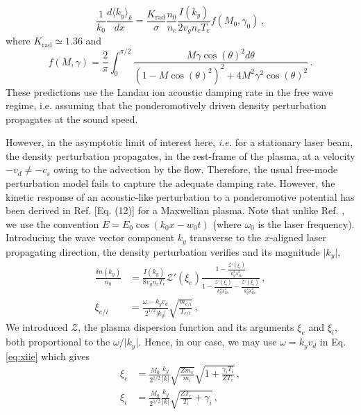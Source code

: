 \documentclass[%
 reprint,
 amsmath,amssymb,
 aps,
]{revtex4-1}
\begin{document}
\begin{equation}
\frac{1}{k_0}\frac{d \langle k_y\rangle_{k}    }{d x} = \frac{K_\mathrm{rad} }{\sigma} \frac{n_0 }{n_c}  \frac{  I(k_y) }{ 2 v_g n_c T_e }  f(M_0,\gamma_0)\, ,\label{eq:dthetarose26}
\end{equation}
where $K_\mathrm{rad} \simeq 1.36$  and 
\begin{equation}
 f(M,\gamma) =\frac{2 }{\pi }  \int_0^{\pi/2}\frac{ M \gamma \cos(\theta)^2  d\theta}{(1-M \cos(\theta)^2)^2 +4M^2 \gamma^2 \cos(\theta)^2}  \, .\label{eq:frose26}
\end{equation}
These predictions use the Landau ion acoustic damping rate in the free wave regime, i.e. assuming that the ponderomotively driven density perturbation propagates at the sound speed.

However, in the asymptotic limit of interest here, \emph{i.e.} for a stationary laser beam, the density perturbation propagates, in the rest-frame of the plasma, at a velocity $-v_d\ne -c_s$ owing to the advection by the flow. Therefore, the usual  free-mode perturbation model fails to capture the adequate damping rate. However, the kinetic response of an acoustic-like perturbation to a ponderomotive potential has been derived in Ref.  \cite{POF_Drake_1973}  [Eq. (12)] for a Maxwellian plasma.
Note that unlike Ref. \cite{POF_Drake_1973}, we use the convention $E=E_0\cos(k_0x-w_0t)$ (where $\omega_0$ is the laser frequency).
Introducing the wave vector component $k_y$ transverse to the $x$-aligned laser propagating direction,  the density perturbation verifies and its magnitude $\vert k_y\vert$, 
\begin{align}
 \frac{ \delta n (k_y) }{n_0}  &=   \frac{  I(k_y) }{ 8 v_g n_c T_e }  \mathcal{Z}'( \xi_e)   \frac{ 1- \frac{ \mathcal{Z}'( \xi_i)  }{ k_y^2\lambda_{Di}^2  }   }{  1- \frac{ \mathcal{Z}'( \xi_i)  }{ k_y^2\lambda_{Di}^2  }- \frac{ \mathcal{Z}'( \xi_e)  }{ k_y^2\lambda_{De}^2  } }    \, , \label{eq:drake}\\
\xi_{e/i } &= \frac{   \omega- k_y v_d }{ 2^{1/2}  \vert k_y\vert }  \sqrt{ \frac{ m_{e/i } }{ T_{e/i }}  }  \label{eq:xiie}   \,  ,
\end{align}
We introduced $ \mathcal{Z}$, the plasma dispersion function \cite{Fried_Gell-Mann_1960} and its arguments $\xi_{e } $ and $\xi_{i }$, both proportional to the $\omega/\vert k_y \vert$. 
Hence, in our case, we may use $\omega=k_yv_d$ in Eq. \eqref{eq:xiie} which gives 
\begin{align}
\xi_{e } &=\frac{   M_0 }{ 2^{1/2} }  \frac{k_y}{\vert k \vert }\sqrt{ \frac{ Z m_{e } }{ m_i }  } \sqrt{1+ \frac{\gamma_i T_i }{ ZT_e }  }   \, , \\
\xi_{i } &= \frac{   M_0}{ 2^{1/2} }  \frac{k_y}{\vert k \vert }\sqrt{ \frac{Z T_{e } }{ T_{i }} +\gamma_i  }    \, ,
\end{align}
\end{document}

